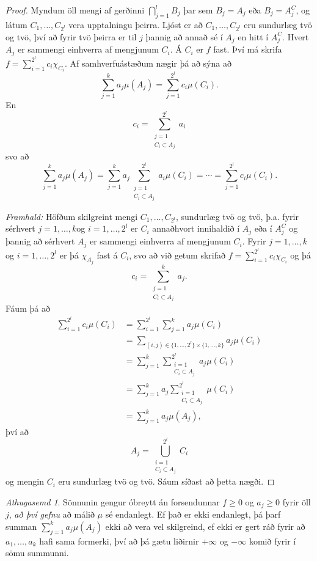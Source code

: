 \documentclass[a4paper,icelandic,11pt]{book}
\theoremstyle{plain}      \newtheorem{setn}{Setning}[chapter]
\theoremstyle{definition} \newtheorem{skilgr}[setn]{Skilgreining}
\theoremstyle{remark}     \newtheorem*{ath}{Athugasemd}
\newcommand{\C}{\mathbb C}
\begin{document}
\begin{proof}
  Myndum öll mengi af gerðinni $\bigcap_{j=1}^{l}B_{j}$ þar sem
  $B_{j}=A_{j}$ eða $B_{j}=A_{j}^{C}$, og látum
  $C_{1},\dots,C_{2^{l}}$ vera upptalningu þeirra. Ljóst er að
  $C_{1},\dots,C_{2^{l}}$ eru sundurlæg tvö og tvö, því að fyrir tvö
  þeirra er til $j$ þannig að annað sé í $A_{j}$ en hitt í
  $A_{j}^{C}$. Hvert $A_{j}$ er sammengi einhverra af mengjunum
  $C_{i}$. Á $C_{i}$ er $f$ fast. Því má skrifa
  $f=\sum_{i=1}^{2^{l}}c_{i}\chi_{C_{i}}$. Af samhverfuástæðum nægir
  þá að sýna að
  \[
  \sum_{j=1}^{k}a_{j}\mu(A_{j})
  = \sum_{j=1}^{2^{l}}c_{i}\mu(C_{i}).
  \]
  En
  \[
  c_{i}
  = \sum_{\substack{j=1\\C_{i}\subset A_{j}}}^{2^{l}}a_{i}
  \]
  svo að
  \[
  \sum_{j=1}^{k}a_{j}\mu(A_{j})
  = \sum_{j=1}^{k}a_{j}
  \sum_{\substack{j=1\\C_{i}\subset A_{j}}}^{2^{l}} a_{i}\mu(C_{i})
  = \cdots
  = \sum_{j=1}^{2^{l}}c_{i}\mu(C_{i}).
  \]

  \emph{Framhald:} Höfðum skilgreint mengi $C_{1},\dots,C_{2^{l}}$, sundurlæg tvö og
  tvö, þ.a. fyrir sérhvert $j=1,\dots,k $og $i=1,\dots,2^{l}$ er
  $C_{i}$ annaðhvort innihaldið í $A_{j}$ eða í $A_{j}^{C}$ og þannig
  að sérhvert $A_{j}$ er sammengi einhverra af mengjunum
  $C_{i}$. Fyrir $j=1,\dots,k$ og $i=1,\dots,2^{l}$ er þá
  $\chi_{A_{j}}$ fast á $C_{i}$, svo að við getum skrifað
  $f=\sum_{i=1}^{2^{l}}c_{i}\chi_{C_{i}}$ og þá
  \[
  c_{i} = \sum_{\substack{j=1\\C_{i}\subset A_{j}}}^{k}a_{j}.
  \]
  Fáum þá að
  \begin{align*}
    \sum_{i=1}^{2^{l}}c_{i}\mu(C_{i})
    &= \sum_{i=1}^{2^{l}}\sum_{j=1}^{k}a_{j}\mu(C_{i}) \\
    &= \sum_{(i,j)\in\{1,\dots,2^{l}\}\times\{1,\dots,k\}}a_{j}\mu(C_{i}) \\
    &= \sum_{j=1}^{k}\sum_{\substack{i=1\\C_{i}\subset A_{j}}}^{2^{l}}a_{j}\mu(C_{i})\\
    &= \sum_{j=1}^{k}a_{j}\sum_{\substack{i=1\\C_{i}\subset A_{j}}}^{2^{l}}\mu(C_{i})\\
    &= \sum_{j=1}^{k}a_{j}\mu(A_{j}),
  \end{align*}
  því að
  \[
  A_{j}=\bigcup_{\substack{i=1\\C_{i}\subset A_{j}}}^{2^{l}}C_{i}
  \]
  og mengin $C_{i}$ eru sundurlæg tvö og tvö. Sáum síðast að þetta
  nægði.
\end{proof}
\begin{ath}
  Sönnunin gengur óbreytt án forsendunnar $f\ge 0$ og $a_{j}\ge 0$
  fyrir öll $j$, \emph{að því gefnu} að málið $\mu$ sé endanlegt. Ef
  það er ekki endanlegt, þá þarf summan
  $\sum_{j=1}^{k}a_{j}\mu(A_{j})$ ekki að vera vel skilgreind, ef ekki
  er gert ráð fyrir að $a_{1},\dots,a_{k}$ hafi sama formerki, því að
  þá gætu liðirnir $+\infty$ og $-\infty$ komið fyrir í sömu summunni.
\end{ath}
\end{document}
